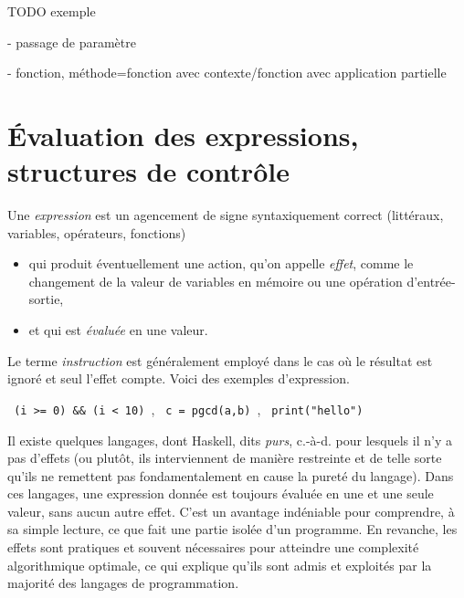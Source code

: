 \documentclass[a4paper,francais]{insalyon}
\newcommand{\cad}{c.-à-d.}
\begin{document}


TODO exemple

- passage de paramètre

- fonction, méthode=fonction avec contexte/fonction avec application partielle



\section{\'Evaluation des expressions, structures de contrôle}



Une \emph{expression} est un agencement de signe syntaxiquement correct (littéraux, variables, opérateurs, fonctions)
\begin{itemize}
\item qui produit éventuellement une action, qu'on appelle \emph{effet}, comme le changement de la valeur de variables en mémoire ou une opération d'entrée-sortie, 
\item et qui est \emph{évaluée} en une valeur. 
\end{itemize}
Le terme \emph{instruction} est généralement employé dans le cas où le résultat est ignoré et seul l'effet compte.
Voici des exemples d'expression. 

\verb! (i >= 0) && (i < 10) !, \verb! c = pgcd(a,b) !, \verb! print("hello") !



Il existe quelques langages, dont Haskell, dits \emph{purs}, {\cad} pour lesquels il n'y a pas d'effets (ou plutôt, ils interviennent de manière restreinte et de telle sorte qu'ils ne remettent pas fondamentalement en cause la pureté du langage). Dans ces langages, une expression donnée est toujours évaluée en une et une seule valeur, sans aucun autre effet. C'est un avantage indéniable pour comprendre, à sa simple lecture, ce que fait une partie isolée d'un programme. En revanche, les effets sont pratiques et souvent nécessaires pour atteindre une complexité algorithmique optimale, ce qui explique qu'ils sont admis et exploités par la majorité des langages de programmation.    
\end{document}
